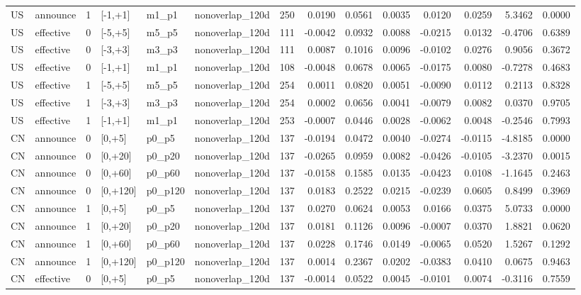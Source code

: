 \begin{tabular}{llrlllrrrrrrrr}
US & announce & 1 & [-1,+1] & m1_p1 & nonoverlap_120d & 250 & 0.0190 & 0.0561 & 0.0035 & 0.0120 & 0.0259 & 5.3462 & 0.0000 \\
US & effective & 0 & [-5,+5] & m5_p5 & nonoverlap_120d & 111 & -0.0042 & 0.0932 & 0.0088 & -0.0215 & 0.0132 & -0.4706 & 0.6389 \\
US & effective & 0 & [-3,+3] & m3_p3 & nonoverlap_120d & 111 & 0.0087 & 0.1016 & 0.0096 & -0.0102 & 0.0276 & 0.9056 & 0.3672 \\
US & effective & 0 & [-1,+1] & m1_p1 & nonoverlap_120d & 108 & -0.0048 & 0.0678 & 0.0065 & -0.0175 & 0.0080 & -0.7278 & 0.4683 \\
US & effective & 1 & [-5,+5] & m5_p5 & nonoverlap_120d & 254 & 0.0011 & 0.0820 & 0.0051 & -0.0090 & 0.0112 & 0.2113 & 0.8328 \\
US & effective & 1 & [-3,+3] & m3_p3 & nonoverlap_120d & 254 & 0.0002 & 0.0656 & 0.0041 & -0.0079 & 0.0082 & 0.0370 & 0.9705 \\
US & effective & 1 & [-1,+1] & m1_p1 & nonoverlap_120d & 253 & -0.0007 & 0.0446 & 0.0028 & -0.0062 & 0.0048 & -0.2546 & 0.7993 \\
CN & announce & 0 & [0,+5] & p0_p5 & nonoverlap_120d & 137 & -0.0194 & 0.0472 & 0.0040 & -0.0274 & -0.0115 & -4.8185 & 0.0000 \\
CN & announce & 0 & [0,+20] & p0_p20 & nonoverlap_120d & 137 & -0.0265 & 0.0959 & 0.0082 & -0.0426 & -0.0105 & -3.2370 & 0.0015 \\
CN & announce & 0 & [0,+60] & p0_p60 & nonoverlap_120d & 137 & -0.0158 & 0.1585 & 0.0135 & -0.0423 & 0.0108 & -1.1645 & 0.2463 \\
CN & announce & 0 & [0,+120] & p0_p120 & nonoverlap_120d & 137 & 0.0183 & 0.2522 & 0.0215 & -0.0239 & 0.0605 & 0.8499 & 0.3969 \\
CN & announce & 1 & [0,+5] & p0_p5 & nonoverlap_120d & 137 & 0.0270 & 0.0624 & 0.0053 & 0.0166 & 0.0375 & 5.0733 & 0.0000 \\
CN & announce & 1 & [0,+20] & p0_p20 & nonoverlap_120d & 137 & 0.0181 & 0.1126 & 0.0096 & -0.0007 & 0.0370 & 1.8821 & 0.0620 \\
CN & announce & 1 & [0,+60] & p0_p60 & nonoverlap_120d & 137 & 0.0228 & 0.1746 & 0.0149 & -0.0065 & 0.0520 & 1.5267 & 0.1292 \\
CN & announce & 1 & [0,+120] & p0_p120 & nonoverlap_120d & 137 & 0.0014 & 0.2367 & 0.0202 & -0.0383 & 0.0410 & 0.0675 & 0.9463 \\
CN & effective & 0 & [0,+5] & p0_p5 & nonoverlap_120d & 137 & -0.0014 & 0.0522 & 0.0045 & -0.0101 & 0.0074 & -0.3116 & 0.7559 \\

\end{tabular}
